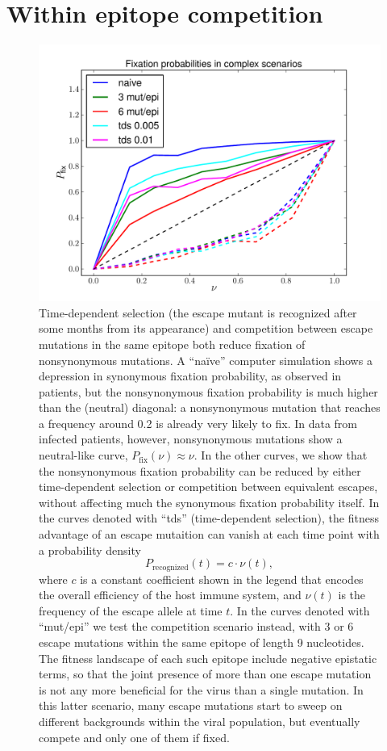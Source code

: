 \documentclass[rmp]{revtex4}
\begin{document}
\newpage
\section{Within epitope competition}
\begin{figure}[h]
\begin{center}
\includegraphics[width=0.8\linewidth]{simulations_graduallyepitopesandtimeselec}
\caption{Time-dependent selection (the escape mutant is recognized after some
months from its appearance) and competition between escape mutations in the same
epitope both reduce fixation of nonsynonymous mutations. A ``na\"ive'' computer
simulation shows a depression in synonymous fixation probability, as observed in
patients, but the nonsynonymous fixation probability is much higher than the
(neutral) diagonal: a nonsynonymous mutation that reaches a frequency around
0.2 is already very likely to fix. In data from infected patients, however,
nonsynonymous mutations show a neutral-like curve,
$P_\text{fix}(\nu) \approx \nu$. In the other curves, we show that the
nonsynonymous fixation probability can be reduced by either time-dependent
selection or competition between equivalent escapes, without affecting much the
synonymous fixation probability itself.
In the curves denoted with ``tds'' (time-dependent selection), the fitness advantage of
an escape mutaition can vanish at each time point with a probability density
\[ P_\text{recognized}(t) = c \cdot \nu(t), \]
where $c$ is a constant coefficient shown in the legend that encodes the overall
efficiency of the host immune system, and $\nu(t)$ is the frequency of the
escape allele at time $t$.
In the curves denoted with ``mut/epi'' we test the
competition scenario instead, with 3 or 6 escape mutations within the same
epitope of length 9 nucleotides. The fitness landscape of each such epitope
include negative epistatic terms, so that the joint presence of more than one
escape mutation is not any more beneficial for the virus than a single mutation.
In this latter scenario, many escape mutations start to sweep on different
backgrounds within the viral population, but eventually compete and only one of
them if fixed.}
\label{fig:tds_wec}
\end{center}
\end{figure}


\end{document}
